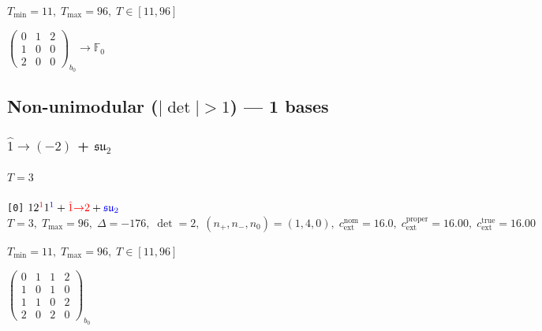 \documentclass[10pt]{article}
\begin{document}
\hspace{1em}$T_{\min}=11,\;T_{\max}=96,\;T\in[11,96]$

\hspace{2em}$\left(\begin{smallmatrix}0 & 1 & 2 \\ 1 & 0 & 0 \\ 2 & 0 & 0\end{smallmatrix}\right)_{\!b_0}\to \mathbb{F}_{0}$

\subsection*{Non-unimodular ($|\det|>1$) --- 1 bases}


\subsubsection*{$\hat{1}{\to}(-2)$ + $\mathfrak{su}_2$}

\paragraph{$T=3$}

\texttt{[0]} $12^{\textcolor{red}{1}}1^{\textcolor{blue}{1}} + \textcolor{red}{\hat{1}{\to}2} + \textcolor{blue}{\mathfrak{su}_2}$ \quad $T=3,\;T_{\max}=96,\;\Delta=-176,\;\det=2,\;(n_+,n_-,n_0)=(1,4,0),\;c_\mathrm{ext}^{\mathrm{nom}}=16.0,\;c_\mathrm{ext}^{\mathrm{proper}}=16.00,\;c_\mathrm{ext}^{\mathrm{true}}=16.00$

\hspace{1em}$T_{\min}=11,\;T_{\max}=96,\;T\in[11,96]$

\hspace{2em}$\left(\begin{smallmatrix}0 & 1 & 1 & 2 \\ 1 & 0 & 1 & 0 \\ 1 & 1 & 0 & 2 \\ 2 & 0 & 2 & 0\end{smallmatrix}\right)_{\!b_0}$
\end{document}
